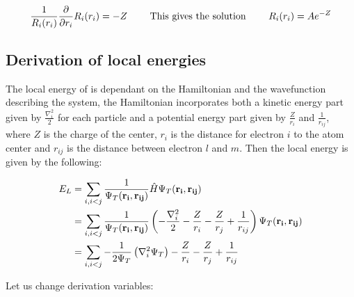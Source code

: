 \documentclass[11pt]{article}
\begin{document}
		\begin{align}
			 \frac{1}{R_i(r_i)} \pdv{}{r_i} R_i(r_i)	=  -Z  \qquad{ \text{ This gives the solution }}  \qquad R_i(r_i) = A e^{-Z}
		\end{align}




	\subsection{Derivation of local energies}
		The local energy of is dependant on the Hamiltonian and the wavefunction describing the system, the Hamiltonian incorporates both a kinetic energy part given by \( \frac{\nabla_i^2}{2} \) for each particle
		and a potential energy part given by \(\frac{Z}{r_i}\) and \(\frac{1}{r_{ij}}\), where \(Z\) is the charge of the center, \(r_i\) is the distance for electron \(i\) to the atom center and \(r_{ij}\) is the distance between electron \(l\) and \(m\). Then the local energy is given by the following:

		\begin{align}
			E_L &= \sum_{i,i<j}{\frac{1}{ \Psi_T(\vb{r_i} , \vb{r_{ij}}) } \hat{H} \Psi_T(\vb{r_i} , \vb{r_{ij}})}
			\\
			&=	\sum_{i,i<j}\frac{1}{ \Psi_T(\vb{r_i} , \vb{r_{ij}}) } \left( - \frac{\nabla_i^2}{2} -\frac{Z}{r_i}  -  \frac{Z}{r_j} +  \frac{1}{r_{ij} }  \right) \Psi_T(\vb{r_i} , \vb{r_{ij}})
			\\
			&= \sum_{i,i<j}{-\frac{1}{2\Psi_T} \left(\nabla_i^2 \Psi_T  \right)  -\frac{Z}{r_i}  -  \frac{Z}{r_j} +  \frac{1}{r_{ij} }}
		\end{align}

		Let us change derivation variables:
\end{document}
